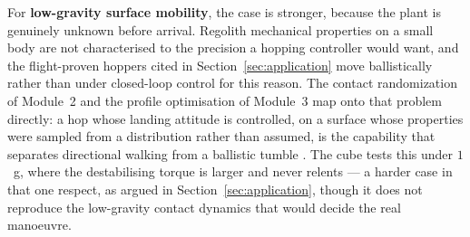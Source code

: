 For \textbf{low-gravity surface mobility}, the case is stronger, because the
plant is genuinely unknown before arrival. Regolith mechanical properties on a
small body are not characterised to the precision a hopping controller would
want, and the flight-proven hoppers cited in Section~\ref{sec:application}
\cite{yoshimitsu1999minerva, ho2017mascot} move ballistically rather than
under closed-loop control for this reason. The contact randomization of
Module~2 and the profile optimisation of Module~3 map onto that problem
directly: a hop whose landing attitude is controlled, on a surface whose
properties were sampled from a distribution rather than assumed, is the
capability that separates directional walking from a ballistic tumble
\cite{spiridonov2024spacehopper}. The cube tests this under $1$~g, where the
destabilising torque is larger and never relents --- a harder case in that one
respect, as argued in Section~\ref{sec:application}, though it does not
reproduce the low-gravity contact dynamics that would decide the real
manoeuvre.


